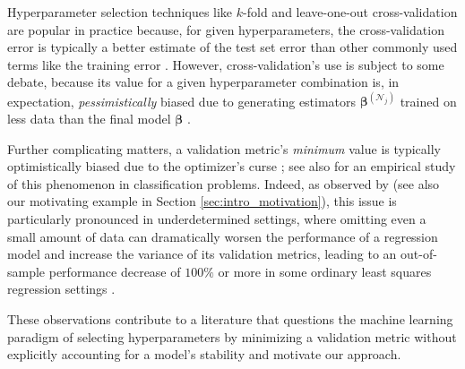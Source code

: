 \documentclass[mnsc,nonblindrev]{informs3} %
\begin{document}
{\color{black}Hyperparameter selection techniques like $k$-fold and leave-one-out cross-validation are popular in practice because, for given hyperparameters, the cross-validation error is typically a %
better estimate of the test set error than other commonly used terms like the training error \citep{kearns1997algorithmic, bousquet2002stability}. %
However, cross-validation's use is subject to some debate, because its value for a given hyperparameter combination %
is, in expectation, \textit{pessimistically} biased due to generating estimators $\bm{\beta}^{(\mathcal{N}_j)}$ trained on less data than the final model $\bm{\beta}$ \citep{arlot2010survey}. 

Further complicating matters, a validation metric's \textit{minimum} value is typically optimistically biased due to the optimizer's curse \citep[]{smith2006optimizer,arlot2010survey}; see also \cite{rao2008dangers} for an empirical study of this phenomenon in classification problems. Indeed, as observed by \citet{rao2008dangers, gupta2024debiasing} (see also our motivating example in Section \ref{sec:intro_motivation}), this issue is particularly pronounced in underdetermined settings, where omitting even a small amount of data can dramatically worsen the performance of a regression model and increase the variance of its validation metrics, leading to an out-of-sample performance decrease of $100\%$ or more in some ordinary least squares regression settings \citep[Figure 1]{gupta2024debiasing}. }

These observations contribute to a literature that questions the machine learning paradigm of selecting hyperparameters by minimizing a validation metric without explicitly accounting for a model's stability \citep{breiman1996heuristics, ban2018machine, gupta2021small,gupta2022data, gupta2024debiasing, bertsimas2023improving} and motivate our approach.
\end{document}
